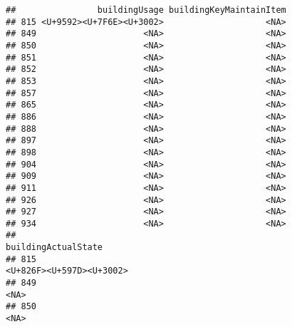 \documentclass[
]{article}
\begin{document}
\begin{verbatim}
##                buildingUsage buildingKeyMaintainItem
## 815 <U+9592><U+7F6E><U+3002>                    <NA>
## 849                     <NA>                    <NA>
## 850                     <NA>                    <NA>
## 851                     <NA>                    <NA>
## 852                     <NA>                    <NA>
## 853                     <NA>                    <NA>
## 857                     <NA>                    <NA>
## 865                     <NA>                    <NA>
## 886                     <NA>                    <NA>
## 888                     <NA>                    <NA>
## 897                     <NA>                    <NA>
## 898                     <NA>                    <NA>
## 904                     <NA>                    <NA>
## 909                     <NA>                    <NA>
## 911                     <NA>                    <NA>
## 926                     <NA>                    <NA>
## 927                     <NA>                    <NA>
## 934                     <NA>                    <NA>
##                                                                                                                                                                                                                                                                                                                                                                                                                          buildingActualState
## 815                                                                                                                                                                                                                                                                                                                                                                                                                 <U+826F><U+597D><U+3002>
## 849                                                                                                                                                                                                                                                                                                                                                                                                                                     <NA>
## 850                                                                                                                                                                                                                                                                                                                                                                                                                                     <NA>

\end{verbatim}
\end{document}
